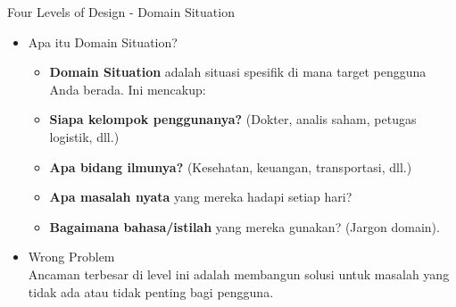 \documentclass[t]{beamer}
\begin{document}
\begin{frame}{Four Levels of Design - Domain Situation}
	\begin{itemize}
		\item Apa itu Domain Situation? 
		
		\begin{itemize}
		\item \textbf{Domain Situation} adalah situasi spesifik di mana target pengguna Anda berada. Ini mencakup:\\
		\item \textbf{Siapa kelompok penggunanya?} (Dokter, analis saham, petugas logistik, dll.) \\
		\item \textbf{Apa bidang ilmunya?} (Kesehatan, keuangan, transportasi, dll.) \\
		\item \textbf{Apa masalah nyata} yang mereka hadapi setiap hari? \\
		\item  \textbf{Bagaimana bahasa/istilah} yang mereka gunakan? (Jargon domain).
		\end{itemize}
		\item Wrong Problem \\
		Ancaman terbesar di level ini adalah membangun solusi untuk masalah yang tidak ada atau tidak penting bagi pengguna.
					
		
	\end{itemize}
\end{frame}

\end{document}
